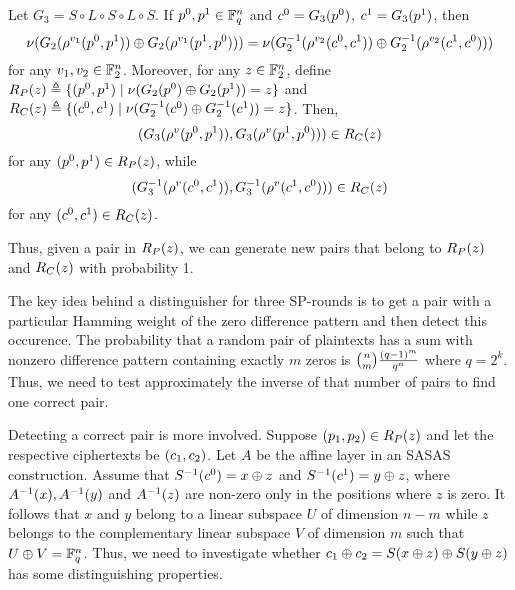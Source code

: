 \documentclass[twoside]{article}
\begin{document}
\begin{theorem}
    \label{thm:yoyo-3-rounds}
    Let \(G_3 = S \circ L \circ S \circ L \circ S\). If \(p^0, p^1 \in \mathbb F_q^n\)
    and \(c^0 = G_3(p^0)\), \(c^1 = G_3(p^1)\), then
    \begin{equation}
        \nu(G_2(\rho^{v_1}(p^0, p^1)) \oplus G_2(\rho^{v_1}(p^1, p^0))) = \nu(G_2^{-1}(\rho^{v_2}(c^0, c^1)) \oplus G_2^{-1}(\rho^{v_2}(c^1, c^0)))
    \end{equation}
    for any \(v_1, v_2 \in \mathbb F_2^n\). Moreover, for any \(z \in \mathbb F_2^n\),
    define \(R_P(z) \triangleq \{(p^0, p^1) \mid
    \nu(G_2(p^0) \oplus G_2(p^1)) = z\}\) and \(R_C(z)
    \triangleq \{(c^0, c^1) \mid \nu(G_2^{-1}(c^0) \oplus
    G_2^{-1}(c^1)) = z\}\). Then,
    \begin{equation}
        (G_3(\rho^v(p^0, p^1)), G_3(\rho^v(p^1, p^0))) \in R_C(z)
    \end{equation}
    for any \((p^0, p^1) \in R_P(z)\), while
    \begin{equation}
        (G_3^{-1}(\rho^v(c^0, c^1)), G_3^{-1}(\rho^v(c^1, c^0))) \in R_C(z)
    \end{equation}
    for any \((c^0, c^1) \in R_C(z)\).
\end{theorem}

Thus, given a pair in \(R_P(z)\), we can generate new pairs that belong to
\(R_P(z)\) and \(R_C(z)\) with probability 1. 

The key idea behind a distinguisher for three SP-rounds is to get a pair with a
particular Hamming weight of the zero difference pattern and then detect this
occurence. The probability that a random pair of plaintexts has a sum with
nonzero difference pattern containing exactly \(m\) zeros is
\(\binom{n}{m}\frac{(q-1)^m}{q^n}\) where \(q = 2^k\). Thus, we need to
test approximately the inverse of that number of pairs to find one correct pair.

Detecting a correct pair is more involved. Suppose \((p_1, p_2) \in
R_P(z)\) and let the respective ciphertexts be \((c_1, c_2)\). Let
\(A\) be the affine layer in an SASAS construction. Assume that
\(S^{-1}(c^0) = x \oplus z\) and \(S^{-1}(c^1) = y \oplus z\), where
\(A^{-1}(x), A^{-1}(y)\) and \(A^{-1}(z)\) are non-zero only in
the positions where \(z\) is zero. It follows that \(x\) and \(y\) belong to a
linear subspace \(U\) of dimension \(n - m\) while \(z\) belongs to the
complementary linear subspace \(V\) of dimension \(m\) such that \(U \oplus V =
\mathbb F_q^n\). Thus, we need to investigate whether \(c_1 \oplus c_2 = S(x
\oplus z) \oplus S(y \oplus z)\) has some distinguishing properties.
\end{document}
